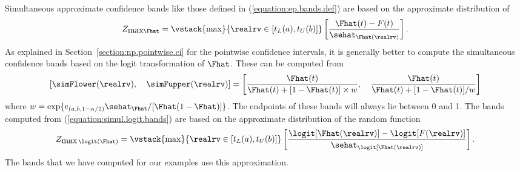 Simultaneous approximate confidence bands like those defined in
(\ref{equation:ep.bands.def}) are based on the approximate
distribution of 
\begin{equation}
\label{equation:nair}
Z_{\mbox{max} \Fhat} = 
\vstack{\max}{\realrv \in [t_{L}(a),t_{U}(b)]}
\left [
 \frac{\Fhat(t)-F(t)}
{ \sehat_{\Fhat(\realrv)}}
\right ] .
\end{equation}
As explained in Section~\ref{section:np.pointwise.ci}
for the pointwise confidence intervals, it is generally better to
compute the simultaneous confidence bands based on the logit
transformation of $\Fhat$. These can be computed from 
\begin{equation}
\label{equation:simul.logit.bands}
[\simFlower(\realrv), \quad \simFupper(\realrv)] = 
\left[\frac{\Fhat(t)}{\Fhat(t)
+[1-\Fhat(t)] \times w},  \quad \frac{\Fhat(t)}{\Fhat(t)+
[1-\Fhat(t)]/w}
\right]
\end{equation}
where
$w=\exp\{e_{(a, b, 1-\alpha/2)}\sehat_{\Fhat}/
[\Fhat(1-\Fhat)]\}$. The endpoints of these bands
will always lie between 0 and 1.
The bands computed from (\ref{equation:simul.logit.bands})
are based on the  approximate
distribution of the random function
\begin{equation}
\label{equation:fhat.sim.logit.stand.z}
Z_{\mbox{max}\, \logit(\Fhat)}= 
\vstack{\max}{\realrv \in [t_{L}(a),t_{U}(b)]}
	\left [
     \frac{\logit[\Fhat(\realrv)]-\logit
[F(\realrv)]}
{ \sehat_{\logit[\Fhat(\realrv)]}}
       \right ].
\end{equation}
The bands that we have computed for our examples use this approximation.


